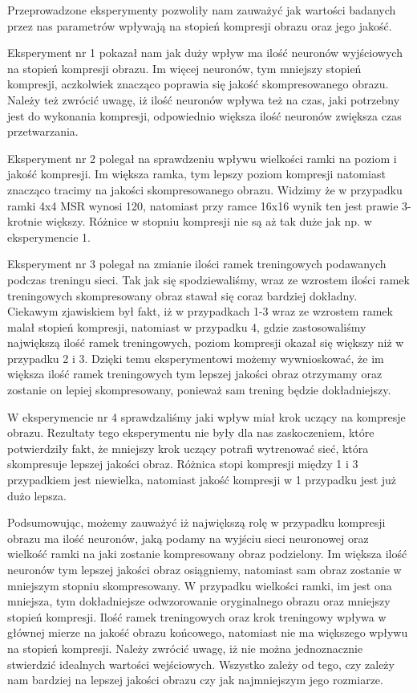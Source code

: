 \documentclass[12pt]{article}
\begin{document}
Przeprowadzone eksperymenty pozwoliły nam zauważyć jak wartości badanych przez nas parametrów wpływają na stopień kompresji obrazu oraz jego jakość. \par
Eksperyment nr 1 pokazał nam jak duży wpływ ma ilość neuronów wyjściowych na stopień kompresji obrazu. Im więcej neuronów, tym mniejszy stopień kompresji, aczkolwiek znacząco poprawia się jakość skompresowanego obrazu. Należy też zwrócić uwagę, iż ilość neuronów wpływa też na czas, jaki potrzebny jest do wykonania kompresji, odpowiednio większa ilość neuronów zwiększa czas przetwarzania.\par
Eksperyment nr 2 polegał na sprawdzeniu wpływu wielkości ramki na poziom i jakość kompresji. Im większa ramka, tym lepszy poziom kompresji natomiast znacząco tracimy na jakości skompresowanego obrazu. Widzimy że w przypadku ramki 4x4 MSR wynosi 120, natomiast przy ramce 16x16 wynik ten jest prawie 3-krotnie większy. Różnice w stopniu kompresji nie są aż tak duże jak np. w eksperymencie 1.\par
Eksperyment nr 3 polegał na zmianie ilości ramek treningowych podawanych podczas treningu sieci. Tak jak się spodziewaliśmy, wraz ze wzrostem ilości ramek treningowych skompresowany obraz stawał się coraz bardziej dokładny. Ciekawym zjawiskiem był fakt, iż w przypadkach 1-3 wraz ze wzrostem ramek malał stopień kompresji, natomiast w przypadku 4, gdzie zastosowaliśmy największą ilość ramek treningowych, poziom kompresji okazał się większy niż w przypadku 2 i 3. Dzięki temu eksperymentowi możemy wywnioskować, że im większa ilość ramek treningowych tym lepszej jakości obraz otrzymamy oraz zostanie on lepiej skompresowany, ponieważ sam trening będzie dokładniejszy.\par
W eksperymencie nr 4 sprawdzaliśmy jaki wpływ miał krok uczący na kompresje obrazu. Rezultaty tego eksperymentu nie były dla nas zaskoczeniem, które potwierdziły fakt, że mniejszy krok uczący potrafi wytrenować sieć, która skompresuje lepszej jakości obraz. Różnica stopi kompresji między 1 i 3 przypadkiem jest niewielka, natomiast jakość kompresji w 1 przypadku jest już dużo lepsza.\par
Podsumowując, możemy zauważyć iż największą rolę w przypadku kompresji obrazu ma ilość neuronów, jaką podamy na wyjściu sieci neuronowej oraz wielkość ramki na jaki zostanie kompresowany obraz podzielony. Im większa ilość neuronów tym lepszej jakości obraz osiągniemy, natomiast sam obraz zostanie w mniejszym stopniu skompresowany. W przypadku wielkości ramki, im jest ona mniejsza, tym dokładniejsze odwzorowanie oryginalnego obrazu oraz mniejszy stopień kompresji. Ilość ramek treningowych oraz krok treningowy wpływa w głównej mierze na jakość obrazu końcowego, natomiast nie ma większego wpływu na stopień kompresji. Należy zwrócić uwagę, iż nie można jednoznacznie stwierdzić idealnych wartości wejściowych. Wszystko zależy od tego, czy zależy nam bardziej na lepszej jakości obrazu czy jak najmniejszym jego rozmiarze.
\end{document}

